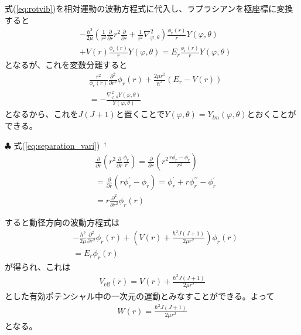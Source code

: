 式(\ref{eq:rotvib})を相対運動の波動方程式に代入し、ラプラシアンを極座標に変換すると
\begin{align}
  &- \frac{\hbar^2}{2 \mu} \left( \frac{1}{r^2} \frac{\partial }{\partial r} r^2 \frac{\partial }{\partial r} + \frac{1}{r^2} \nabla^2_{\varphi,\theta} \right) \frac{\phi_r(r)}{r} Y(\varphi, \theta) \nonumber \\
&+ V(r) \frac{\phi_r(r)}{r} Y(\varphi, \theta) = E_r \frac{\phi_r(r)}{r} Y(\varphi, \theta)
\end{align}
となるが、これを変数分離すると
\begin{align}
\label{eq:separation_vari}
&\frac{r^2}{ \phi_r(r)}\frac{\partial^2}{\partial r^2} \phi_r(r) + \frac{2 \mu r^2}{\hbar^2} (E_r - V(r)) \nonumber \\
&= - \frac{\nabla^2_{\varphi,\theta} Y(\varphi,\theta)}{Y(\varphi,\theta)}
\end{align}
となるから、これを$J(J+1)$と置くことで$Y(\varphi,\theta) = Y_{lm}(\varphi,\theta) $とおくことができる。

\begin{itembox}{$\clubsuit$ 式(\ref{eq:separation_vari}) $\,^\dagger$}
\footnotesize
\begin{align}
  &\frac{\partial}{\partial r} \left(r^2 \frac{\partial}{\partial r} \frac{\phi_r}{r} \right)
  = \frac{\partial}{\partial r} \left( r^2 \frac{r \phi_r^\prime - \phi_r}{r^2}\right) \nonumber \\
  &= \frac{\partial}{\partial r} ( r \phi_r^\prime - \phi_r)
  = \phi_r^\prime + r \phi_r^{\prime\prime} - \phi_r^\prime \nonumber \\ 
  &= r \frac{\partial^2}{\partial r^2} \phi_r(r)
\end{align}
\end{itembox}

すると動径方向の波動方程式は
\begin{align}
&- \frac{\hbar^2}{2 \mu} \frac{\partial^2}{\partial r^2} \phi_r(r) + \left(  V(r) + \frac{\hbar^2 J(J+1)}{2 \mu r^2} \right) \phi_r(r) \nonumber \\
&= E_r \phi_r(r)
\end{align}
が得られ、これは
\begin{align}
V_\mathrm{eff} (r) = V(r) + \frac{\hbar^2 J(J+1)}{2 \mu r^2} 
\end{align}
とした有効ポテンシャル中の一次元の運動とみなすことができる。よって
\begin{align}
  W(r) = \frac{\hbar^2 J(J+1)}{2 \mu r^2} 
\end{align}
となる。 

